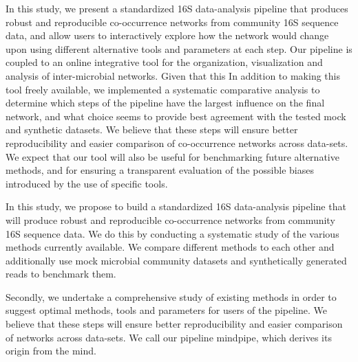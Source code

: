   In this study, we present a standardized 16S data-analysis pipeline that produces robust and reproducible co-occurrence networks from community 16S sequence data, and allow users to interactively explore how the network would change upon using different alternative tools and parameters at each step. Our pipeline is coupled to an online integrative tool for the organization, visualization and analysis of inter-microbial networks. Given that this 
  In addition to making this tool freely available, we implemented a systematic comparative analysis to determine which steps of the pipeline have the largest influence on the final network, and what choice seems to provide best agreement with the tested mock and synthetic datasets.
  We believe that these steps will ensure better reproducibility and easier comparison of co-occurrence networks across data-sets. We expect that our tool will also be useful for benchmarking future alternative methods, and for ensuring a transparent evaluation of the possible biases introduced by the use of specific tools.  

  
  
  In this study, we propose to build a standardized 16S data-analysis pipeline that will produce robust and reproducible co-occurrence networks from community 16S sequence data.
  We do this by conducting a systematic study of the various methods currently available.
  We compare different methods to each other and additionally use mock microbial community datasets and synthetically generated reads to benchmark them.

  Secondly, we undertake a comprehensive study of existing methods in order to suggest optimal methods, tools and parameters for users of the pipeline.
  We believe that these steps will ensure better reproducibility and easier comparison of networks across data-sets.
  We call our pipeline mindpipe, which derives its origin from the \ac{mind}.

